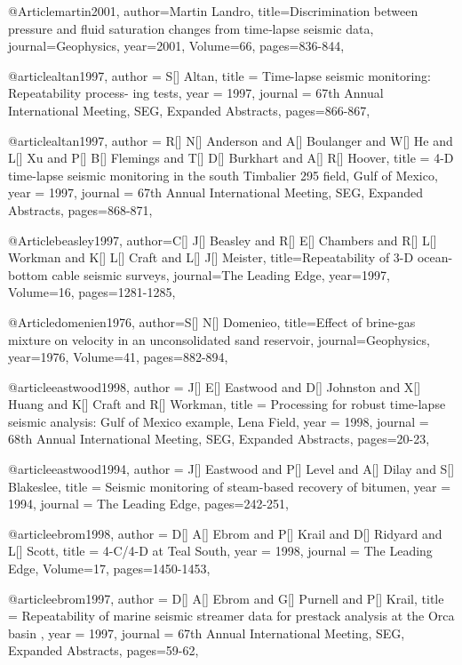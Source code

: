 @Article{martin2001,
  author={Martin Landro},
  title={Discrimination between pressure and fluid saturation changes from time‐lapse seismic data},
  journal={Geophysics},
  year=2001,
  Volume=66,
  pages={836-844},
}

@article{altan1997,
  author =	 {S[] Altan},
  title =	 {Time-lapse seismic monitoring: Repeatability process-
ing tests},
  year =	 1997,
  journal =	 {67th Annual International Meeting, SEG, Expanded Abstracts},
 pages=866-867,
}

@article{altan1997,
  author =	 {R[] N[] Anderson and A[] Boulanger and W[] He and L[] Xu and P[] B[] Flemings and T[] D[] Burkhart and A[] R[] Hoover},
  title =	 {4-D time-lapse seismic
monitoring in the south Timbalier 295 field, Gulf of Mexico},
  year =	 1997,
  journal =	 {67th Annual International Meeting, SEG, Expanded Abstracts},
 pages=868-871,
}

@Article{beasley1997,
  author={C[] J[] Beasley and R[] E[] Chambers and R[] L[] Workman and K[] L[] Craft and L[] J[] Meister},
  title={Repeatability of 3-D ocean-bottom cable seismic
surveys},
  journal={The Leading Edge},
  year=1997,
  Volume=16,
  pages={1281-1285},
}


@Article{domenien1976,
  author={S[] N[] Domenieo},
  title={Effect of brine-gas mixture on velocity in an
unconsolidated sand reservoir},
  journal={Geophysics},
  year=1976,
  Volume=41,
  pages={882-894},
}

@article{eastwood1998,
  author =	 {J[] E[] Eastwood and D[] Johnston and X[] Huang and K[] Craft and R[] Workman},
  title =	 { Processing for robust time-lapse seismic analysis: Gulf of
Mexico example, Lena Field},
  year =	 1998,
  journal =	 {68th Annual International Meeting, SEG, Expanded Abstracts},
 pages=20-23,
}


@article{eastwood1994,
  author =	 {J[] Eastwood and P[] Level and A[] Dilay and S[] Blakeslee},
  title =	 {Seismic monitoring of steam-based recovery of bitumen},
  year =	 1994,
  journal =	 {The Leading Edge},
 pages=242-251,
}

@article{ebrom1998,
  author =	 {D[] A[] Ebrom and P[] Krail and D[] Ridyard and L[] Scott},
  title =	 {4-C/4-D at Teal South},
  year =	 1998,
  journal =	 {The Leading Edge},
    Volume=17,
 pages=1450-1453,
}

@article{ebrom1997,
  author =	 {D[] A[] Ebrom and G[] Purnell and P[] Krail},
  title =	 { Repeatability of marine seismic streamer data for prestack analysis at the Orca basin },
  year =	 1997,
  journal =	 {67th Annual International Meeting, SEG, Expanded Abstracts},
 pages=59-62,
}

